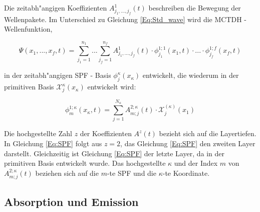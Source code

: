 Die zeitabh"angigen Koeffizienten $A^{1}_{j_{1}, ..., j_{f}}(t)$ beschreiben die Bewegung der Wellenpakete. Im Unterschied zu Gleichung \ref{Eq:Std_wave} wird die MCTDH - Wellenfunktion,

 \begin{equation}
 \Psi(x_{1},..., x_{f}, t)=\sum^{n_{1}}_{j_{1}=1} ... \sum^{n_{f}}_{j_{f}=1} A^{1}_{j_{1}, ..., j_{f}}(t)
 \cdot \phi^{1;1}_{j_{1}}(x_{1}, t) \cdot ... \cdot \phi^{1;f}_{j_{f}}(x_{f}, t)
 \label{Eq:mctdh_wave}
 \end{equation}

in der zeitabh"angigen SPF - Basis $\phi^{\kappa}_{j}(x_{\kappa})$ entwickelt, die wiederum in der primitiven Basis $\mathcal{X}^{\kappa}_{j}(x_{\kappa})$ entwickelt wird:

\begin{equation}
 \phi^{1;\kappa}_{m} (x_{\kappa}, t)=\sum^{N_{\kappa}}_{j=1} A^{2;\kappa}_{m;j}(t) \cdot \mathcal{X}^{(\kappa)}_{j}(x_{1})
 \label{Eq:SPF}
 \end{equation}

Die hochgestellte Zahl $z$ der Koeffizienten $A^{z}(t)$ bezieht sich auf die Layertiefen.
In Gleichung \ref{Eq:SPF} folgt aus $z=2$, das Gleichung \ref{Eq:SPF} den zweiten Layer darstellt.
Gleichzeitig ist Gleichung \ref{Eq:SPF} der letzte Layer, da in der primitiven Basis entwickelt wurde.
Das hochgestellte $\kappa$ und der Index $m$ von $A^{2;\kappa}_{m;j}(t)$ beziehen sich auf die $m$-te SPF und die $\kappa$-te Koordinate.






 \subsection{Absorption und Emission}
